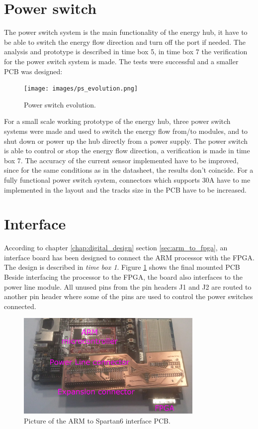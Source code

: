 \section{Power switch}
The power switch system is the main functionality of the energy hub, it have to be able to switch the energy flow direction and turn off the port if needed. The analysis and prototype is described in time box 5, in time box 7 the verification for the power switch system is made.
\p
The tests were successful and a smaller PCB was designed:
\begin{figure}[H]
	\begin{centering}
		\texttt{[image: images/ps\_evolution.png]}
		\caption{Power switch evolution.}
	\end{centering}
\end{figure}

For a small scale working prototype of the energy hub, three power switch systems were made and used to switch the energy flow from/to modules, and to shut down or power up the hub directly from a power supply.
\p
The power switch is able to control or stop the energy flow direction, a verification is made in time box 7. The accuracy of the current sensor implemented have to be improved, since for the same conditions as in the datasheet, the results don't coincide. For a fully functional power switch system, connectors which supports 30A have to me implemented in the layout and the tracks size in the PCB have to be increased.
%

\section{Interface}
According to chapter \ref{chap:digital_design} section \ref{sec:arm_to_fpga}, an interface board has been designed to connect the ARM processor with the FPGA. 
The design is described in \textit{time box 1}. Figure \ref{fig:arm2fpga_interface} shows the final mounted PCB
\p Beside interfacing the processor to the FPGA, the board also interfaces to the power line module. 
\p All unused pins from the pin headers J1 and J2 are routed to another pin header where some of the pins are used to control the power switches connected.
 
\begin{figure}[H]
	\begin{centering}
		 \includegraphics[width=0.80\textwidth]{images/hw_interface_photo_v0_2.jpg}
		\caption{Picture of the ARM to Spartan6 interface PCB.}
		\label{fig:arm2fpga_interface}
	\end{centering}
\end{figure}
